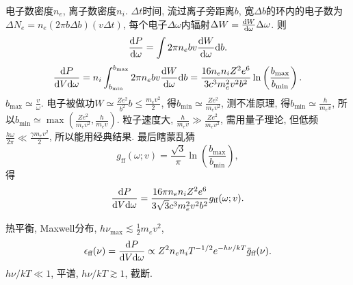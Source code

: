 电子数密度$n_e$, 离子数密度$n_i$. $\Delta t$时间, 流过离子旁距离$b$, 宽$\Delta b$的环内的电子数为$\Delta N_e=n_e(2\pi b\Delta b)(v\Delta t)$, 每个电子$\Delta\omega$内辐射$\Delta W=\frac{\mathrm{d} W}{\mathrm{d}\omega}\Delta\omega$. 则
\begin{equation}
    \frac{\mathrm{d} P}{\mathrm{d} \omega}=\int 2\pi n_e bv\frac{\mathrm{d} W}{\mathrm{d}\omega}\mathrm{d} b.
\end{equation}
\begin{equation}
    \frac{\mathrm{d} P}{\mathrm{d} V\mathrm{d} \omega}=n_i\int_{b_\text{min}}^{b_\text{max}} 2\pi n_e bv\frac{\mathrm{d} W}{\mathrm{d}\omega}\mathrm{d} b=\frac{16n_en_iZ^2e^6}{3c^3m_e^2v^2b^2}\ln\left(\frac{b_\text{max}}{b_\text{min}}\right).
\end{equation}
$b_\text{max}\simeq\frac{v}{\omega}$. 电子被做功$W\simeq\frac{Ze^2}{b^2}b\leqslant\frac{m_ev^2}{2}$, 得$b_\text{min}\simeq\frac{Ze^2}{m_ev^2}$, 测不准原理, 得$b_\text{min}\simeq\frac{h}{m_ev}$, 所以$b_\text{min}\simeq\max\left(\frac{Ze^2}{m_ev^2},\frac{h}{m_ev}\right)$. 粒子速度大, $\frac{h}{m_ev}\gg\frac{Ze^2}{m_ev^2}$, 需用量子理论, 但低频$\frac{h\omega}{2\pi}\ll\frac{\gamma m_ev^2}{2}$, 所以能用经典结果. 最后瞎蒙乱猜
\begin{equation}
    g_\text{ff}(\omega;v)=\frac{\sqrt{3}}{\pi}\ln\left(\frac{b_\text{max}}{b_\text{min}}\right),
\end{equation}
得
\begin{equation}
    \frac{\mathrm{d} P}{\mathrm{d} V\mathrm{d} \omega}=\frac{16\pi n_en_iZ^2e^6}{3\sqrt{3}c^3m_e^2v^2b^2}g_\text{ff}(\omega;v).
\end{equation}

热平衡, Maxwell分布, $h\nu_\text{max}\lesssim\frac{1}{2}m_ev^2$,
\begin{equation}
    \epsilon_\text{ff}(\nu)=\frac{\mathrm{d} P}{\mathrm{d} V\mathrm{d} \omega}\propto Z^2n_en_iT^{-1/2}e^{-h\nu/kT}\bar{g}_\text{ff}(\nu).
\end{equation}
$h\nu/kT\ll1$, 平谱, $h\nu/kT\gtrsim1$, 截断.
